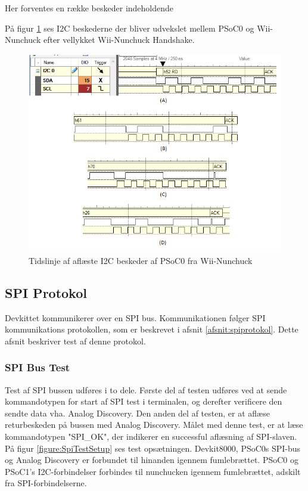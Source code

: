 Her forventes en række beskeder indeholdende 

På figur \ref{fig:NunchuckReadValues} ses I2C beskederne der bliver udvekslet mellem PSoC0 og Wii-Nunchuck efter vellykket Wii-Nunchuck Handshake. 

\begin{figure}[H]
	\centering
	\includegraphics[width=\textwidth]{Test/images/readvaluesEdited.png}
	\caption{Tidslinje af aflæste I2C beskeder af PSoC0 fra Wii-Nunchuck}
	\label{fig:NunchuckReadValues}
\end{figure}

\subsection{SPI Protokol}
Devkittet kommunikerer over en SPI bus. Kommunikationen følger SPI kommunikations protokollen, som er beskrevet i afsnit \ref{afsnit:spiprotokol}. Dette afsnit beskriver test af denne protokol.

\subsubsection{SPI Bus Test}
Test af SPI bussen udføres i to dele. Første del af testen udføres ved at sende kommandotypen for start af SPI test i terminalen, og derefter verificere den sendte data vha. Analog Discovery. Den anden del af testen, er at aflæse returbeskeden på bussen med Analog Discovery. Målet med denne test, er at læse kommandotypen "SPI\_OK", der indikerer en successful aflæsning af SPI-slaven.  På figur \ref{figure:SpiTestSetup} ses test opsætningen. Devkit8000, PSoC0s SPI-bus og Analog Discovery  er forbundet til hinanden igennem fumlebrættet. PSoC0 og PSoC1's I2C-forbindelser forbindes til nunchucken igennem fumlebrættet, adskilt fra SPI-forbindelserne.


